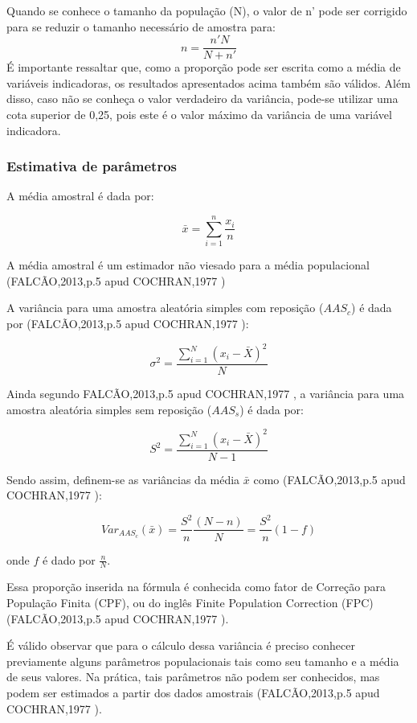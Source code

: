 \documentclass[a4paper, 12pt]{article}
\begin{document}
Quando se conhece o tamanho da população (N), o valor de n' pode ser corrigido para se reduzir o tamanho necessário de amostra para:
{\large $$n=\frac{n'N}{N+n'}$$}
É importante ressaltar que, como a proporção pode ser escrita como a média de variáveis indicadoras, os resultados apresentados acima também são válidos. Além disso, caso não se conheça o valor verdadeiro da variância, pode-se utilizar uma cota superior de 0,25, pois este é o valor máximo da variância de uma variável indicadora. \cite{cochran1977sampling}

\subsubsection{Estimativa de parâmetros}

A média amostral é dada por:

$$\bar{x}=\sum^n_{i=1}\frac{x_i}{n}$$

A média amostral é um estimador não viesado para a média populacional (FALCÃO,2013,p.5 \cite{joao} apud COCHRAN,1977 \cite{cochran1977sampling})

A variância para uma amostra aleatória simples com reposição ($AAS_c$) é dada por (FALCÃO,2013,p.5 \cite{joao} apud COCHRAN,1977 \cite{cochran1977sampling}):  

$$\sigma^2 = \frac{\sum^N_{i=1}(x_i-\bar{X})^2}{N}$$

Ainda segundo FALCÃO,2013,p.5 \cite{joao} apud COCHRAN,1977 \cite{cochran1977sampling}, a variância para uma amostra aleatória simples sem reposição ($AAS_s$) é dada por:

$$S^2=\frac{\sum^N_{i=1}(x_i-\bar{X})^2}{N-1}$$

Sendo assim, definem-se as variâncias da média $\bar{x}$ como (FALCÃO,2013,p.5 \cite{joao} apud COCHRAN,1977 \cite{cochran1977sampling}):

$$Var_{AAS_c}(\bar{x})=\frac{S^2}{n}\frac{(N-n)}{N} = \frac{S^2}{n}(1-f)$$

onde $f$ é dado por $\frac{n}{N}$.

Essa proporção inserida na fórmula é conhecida como fator de Correção para
População Finita (CPF), ou do inglês Finite Population Correction (FPC) (FALCÃO,2013,p.5 \cite{joao} apud COCHRAN,1977 \cite{cochran1977sampling}).

É válido observar que para o cálculo dessa variância é preciso conhecer previamente alguns parâmetros populacionais tais como seu tamanho e a média de seus valores. Na prática, tais parâmetros não podem ser conhecidos, mas podem ser estimados a partir dos dados amostrais (FALCÃO,2013,p.5 \cite{joao} apud COCHRAN,1977 \cite{cochran1977sampling}).
\end{document}
